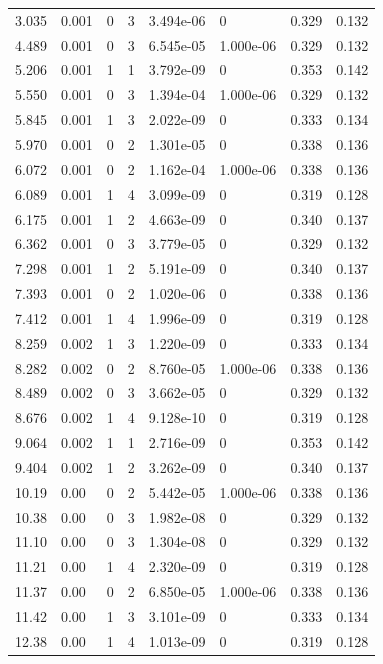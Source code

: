 \documentclass[preview]{standalone}
\begin{document}
{{\begin{tabular}{L{1.2cm}C{1.2cm} C{0.3cm}C{0.5cm} C{1.4cm}C{1.4cm} C{1.4cm}C{1.4cm}}
  3.035  &  0.001  & 0     &  3 &  3.494e-06  & 0  & 0.329 &  0.132   \\ 
  4.489  &  0.001  & 0     &  3 &  6.545e-05  & 1.000e-06  & 0.329 &  0.132   \\ 
  5.206  &  0.001  & 1     &  1 &  3.792e-09  & 0  & 0.353 &  0.142   \\ 
  5.550  &  0.001  & 0     &  3 &  1.394e-04  & 1.000e-06  & 0.329 &  0.132   \\ 
  5.845  &  0.001  & 1     &  3 &  2.022e-09  & 0  & 0.333 &  0.134   \\ 
  5.970  &  0.001  & 0     &  2 &  1.301e-05  & 0  & 0.338 &  0.136   \\ 
  6.072  &  0.001  & 0     &  2 &  1.162e-04  & 1.000e-06  & 0.338 &  0.136   \\ 
  6.089  &  0.001  & 1     &  4 &  3.099e-09  & 0  & 0.319 &  0.128   \\ 
  6.175  &  0.001  & 1     &  2 &  4.663e-09  & 0  & 0.340 &  0.137   \\ 
  6.362  &  0.001  & 0     &  3 &  3.779e-05  & 0  & 0.329 &  0.132   \\ 
  7.298  &  0.001  & 1     &  2 &  5.191e-09  & 0  & 0.340 &  0.137   \\ 
  7.393  &  0.001  & 0     &  2 &  1.020e-06  & 0  & 0.338 &  0.136   \\ 
  7.412  &  0.001  & 1     &  4 &  1.996e-09  & 0  & 0.319 &  0.128   \\ 
  8.259  &  0.002  & 1     &  3 &  1.220e-09  & 0  & 0.333 &  0.134   \\ 
  8.282  &  0.002  & 0     &  2 &  8.760e-05  & 1.000e-06  & 0.338 &  0.136   \\ 
  8.489  &  0.002  & 0     &  3 &  3.662e-05  & 0  & 0.329 &  0.132   \\ 
  8.676  &  0.002  & 1     &  4 &  9.128e-10  & 0  & 0.319 &  0.128   \\ 
  9.064  &  0.002  & 1     &  1 &  2.716e-09  & 0  & 0.353 &  0.142   \\ 
  9.404  &  0.002  & 1     &  2 &  3.262e-09  & 0  & 0.340 &  0.137   \\ 
  10.19  &  0.00  & 0     &  2 &  5.442e-05  & 1.000e-06  & 0.338 &  0.136   \\ 
  10.38  &  0.00  & 0     &  3 &  1.982e-08  & 0  & 0.329 &  0.132   \\ 
  11.10  &  0.00  & 0     &  3 &  1.304e-08  & 0  & 0.329 &  0.132   \\ 
  11.21  &  0.00  & 1     &  4 &  2.320e-09  & 0  & 0.319 &  0.128   \\ 
  11.37  &  0.00  & 0     &  2 &  6.850e-05  & 1.000e-06  & 0.338 &  0.136   \\ 
  11.42  &  0.00  & 1     &  3 &  3.101e-09  & 0  & 0.333 &  0.134   \\ 
  12.38  &  0.00  & 1     &  4 &  1.013e-09  & 0  & 0.319 &  0.128   \\ 
\hline 
\end{tabular} 

}}
\end{document}
